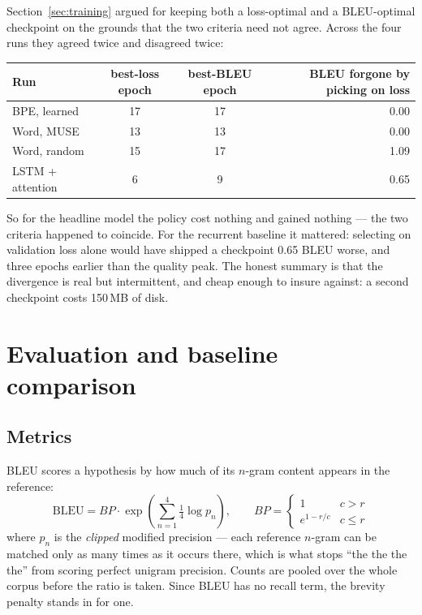 \documentclass[11pt,a4paper]{article}
\begin{document}
Section~\ref{sec:training} argued for keeping both a loss-optimal and a
BLEU-optimal checkpoint on the grounds that the two criteria need not agree.
Across the four runs they agreed twice and disagreed twice:

\begin{center}
\begin{tabular}{@{}lccr@{}}
\toprule
Run & best-loss epoch & best-BLEU epoch & BLEU forgone by picking on loss \\
\midrule
BPE, learned      & 17 & 17 & 0.00 \\
Word, MUSE        & 13 & 13 & 0.00 \\
Word, random      & 15 & 17 & 1.09 \\
LSTM + attention  &  6 &  9 & 0.65 \\
\bottomrule
\end{tabular}
\end{center}

So for the headline model the policy cost nothing and gained nothing --- the two
criteria happened to coincide. For the recurrent baseline it mattered: selecting
on validation loss alone would have shipped a checkpoint 0.65 BLEU worse, and
three epochs earlier than the quality peak. The honest summary is that the
divergence is real but intermittent, and cheap enough to insure against: a
second checkpoint costs 150\,MB of disk.


\section{Evaluation and baseline comparison}
\label{sec:evaluation}

\subsection{Metrics}

BLEU \cite{papineni2002} scores a hypothesis by how much of its $n$-gram
content appears in the reference:
\begin{equation}
\mathrm{BLEU} = BP \cdot \exp\!\left(\sum_{n=1}^{4} \tfrac{1}{4} \log p_n\right),
\qquad
BP = \begin{cases} 1 & c > r \\ e^{1 - r/c} & c \le r \end{cases}
\end{equation}
where $p_n$ is the \emph{clipped} modified precision --- each reference
$n$-gram can be matched only as many times as it occurs there, which is what
stops ``the the the the'' from scoring perfect unigram precision. Counts are
pooled over the whole corpus before the ratio is taken. Since BLEU has no
recall term, the brevity penalty stands in for one.
\end{document}
